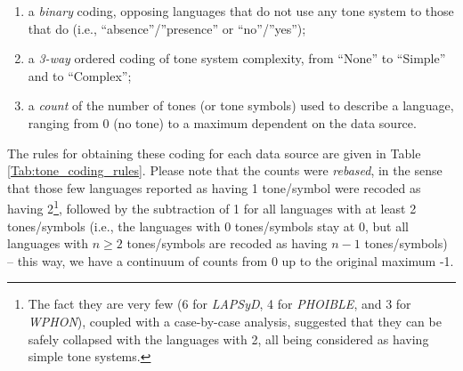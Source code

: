\documentclass[twoside,onecolumn]{article}
\begin{document}
\begin{enumerate}
  \item a \emph{binary} coding, opposing languages that do not use any tone system to those that do (i.e., ``absence''/''presence'' or ``no''/''yes'');
  \item a \emph{3-way} ordered coding of tone system complexity, from ``None'' to ``Simple'' and to ``Complex'';
  \item a \emph{count} of the number of tones (or tone symbols) used to describe a language, ranging from 0 (no tone) to a maximum dependent on the data source.
\end{enumerate}

The rules for obtaining these coding for each data source are given in Table \ref{Tab:tone_coding_rules}.
Please note that the counts were \emph{rebased}, in the sense that those few languages reported as having 1 tone/symbol were recoded as having 2\footnote{The fact they are very few (6 for \textit{LAPSyD}, 4 for \textit{PHOIBLE}, and 3 for \textit{WPHON}), coupled with a case-by-case analysis, suggested that they can be safely collapsed with the languages with 2, all being considered as having simple tone systems.}, followed by the subtraction of 1 for all languages with at least 2 tones/symbols (i.e., the languages with 0 tones/symbols stay at 0, but all languages with $n \geq 2$ tones/symbols are recoded as having $n-1$ tones/symbols) -- this way, we have a continuum of counts from 0 up to the original maximum -1.
\end{document}
